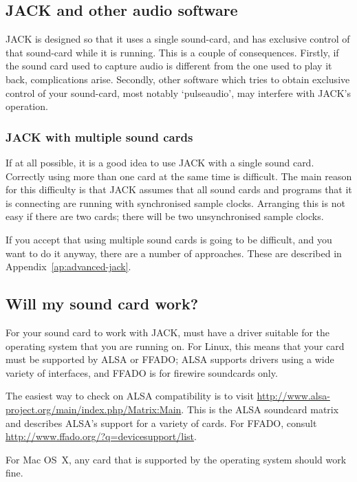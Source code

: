 \documentclass[10pt,a4paper]{book}
\begin{document}
\subsection{JACK and other audio software}

JACK is designed so that it uses a single sound-card, and has
exclusive control of that sound-card while it is running.  This is a
couple of consequences.  Firstly, if the sound card used to capture
audio is different from the one used to play it back, complications
arise.  Secondly, other software which tries to obtain exclusive
control of your sound-card, most notably `pulseaudio', may interfere
with JACK's operation.


\subsubsection{JACK with multiple sound cards}
\label{sec:jack-multiple-cards}

If at all possible, it is a good idea to use JACK with a single sound
card.  Correctly using more than one card at the same time is
difficult.  The main reason for this difficulty is that JACK assumes
that all sound cards and programs that it is connecting are running
with synchronised sample clocks.  Arranging this is not easy if there
are two cards; there will be two unsynchronised sample clocks.

If you accept that using multiple sound cards is going to be
difficult, and you want to do it anyway, there are a number of
approaches.  These are described in Appendix~\ref{ap:advanced-jack}.


\subsection{Will my sound card work?}

For your sound card to work with JACK, must have a driver suitable for
the operating system that you are running on.  For Linux, this means
that your card must be supported by ALSA or FFADO; ALSA supports
drivers using a wide variety of interfaces, and FFADO is for firewire
soundcards only. 

The easiest way to check on ALSA compatibility is to visit
\url{http://www.alsa-project.org/main/index.php/Matrix:Main}.  This is
the ALSA soundcard matrix and describes ALSA's support for a variety
of cards.  For FFADO, consult
\url{http://www.ffado.org/?q=devicesupport/list}.

For Mac OS~X, any card that is supported by the operating system
should work fine.
\end{document}
